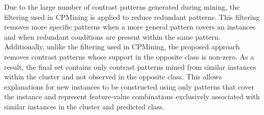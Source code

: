 Due to the large number of contrast patterns generated during mining, the filtering used in CPMining is applied to reduce redundant patterns. This filtering removes more specific patterns when a more general pattern covers an instances and when redundant conditions are present within the same pattern. Additionally, unlike the filtering used in CPMining, the proposed approach removes contrast patterns whose support in the opposite class is non-zero. {\color{blue}As a result, the final set contains only contrast patterns mined from similar instances within the cluster and not observed in the opposite class. This allows explanations for new instances to be constructed using only patterns that cover the instance and represent feature-value combinations exclusively associated with similar instances in the cluster and predicted class.}\newline

